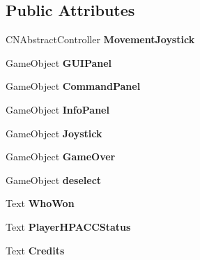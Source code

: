 \subsection*{Public Attributes}
\begin{DoxyCompactItemize}
\item 
\hypertarget{class_g_u_i_a6763b700f36a7db5fd554844b49878bc}{}C\+N\+Abstract\+Controller {\bfseries Movement\+Joystick}\label{class_g_u_i_a6763b700f36a7db5fd554844b49878bc}

\item 
\hypertarget{class_g_u_i_a14f8e6548096c1359a8ebc34fe0f9a65}{}Game\+Object {\bfseries G\+U\+I\+Panel}\label{class_g_u_i_a14f8e6548096c1359a8ebc34fe0f9a65}

\item 
\hypertarget{class_g_u_i_ac0805fbcc86c95ed731495244dccdb3c}{}Game\+Object {\bfseries Command\+Panel}\label{class_g_u_i_ac0805fbcc86c95ed731495244dccdb3c}

\item 
\hypertarget{class_g_u_i_a7017a5575e1f68c778035dc8710072c0}{}Game\+Object {\bfseries Info\+Panel}\label{class_g_u_i_a7017a5575e1f68c778035dc8710072c0}

\item 
\hypertarget{class_g_u_i_ae43d9f0293a09c96ed508eb399a38917}{}Game\+Object {\bfseries Joystick}\label{class_g_u_i_ae43d9f0293a09c96ed508eb399a38917}

\item 
\hypertarget{class_g_u_i_a31d64226a64bcd157da7ed8a9b2d2d51}{}Game\+Object {\bfseries Game\+Over}\label{class_g_u_i_a31d64226a64bcd157da7ed8a9b2d2d51}

\item 
\hypertarget{class_g_u_i_a73a7fae16f27a09ad2aff4edb92b5b71}{}Game\+Object {\bfseries deselect}\label{class_g_u_i_a73a7fae16f27a09ad2aff4edb92b5b71}

\item 
\hypertarget{class_g_u_i_accb71cbb0c47219f6736f1f77635c298}{}Text {\bfseries Who\+Won}\label{class_g_u_i_accb71cbb0c47219f6736f1f77635c298}

\item 
\hypertarget{class_g_u_i_a245430b404b84235997aacbafe163ee6}{}Text {\bfseries Player\+H\+P\+A\+C\+C\+Status}\label{class_g_u_i_a245430b404b84235997aacbafe163ee6}

\item 
\hypertarget{class_g_u_i_aa427677473d5e36aa9eacfe426ccbb40}{}Text {\bfseries Credits}\label{class_g_u_i_aa427677473d5e36aa9eacfe426ccbb40}


\end{DoxyCompactItemize}
